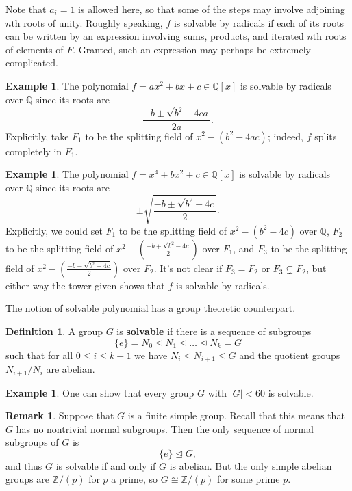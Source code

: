 \documentclass[12pt]{report}
\numberwithin{equation}{section}
\numberwithin{theorem}{chapter}
\theoremstyle{definition}
\newtheorem{definition}[theorem]{Definition}
\newtheorem{example}[theorem]{Example}
\newtheorem*{basic properties}{Basic Properties}
\newtheorem*{Important Remark}{Important Remark}
\newtheorem{remark}[theorem]{Remark}
\def\nsg{\unlhd}
\begin{document}
Note that $a_i = 1$ is allowed here, so that some of the steps may involve adjoining $n$th roots of unity. Roughly speaking, $f$ is solvable by radicals if each of its roots can be written by an expression involving sums, products, and iterated $n$th roots of elements of $F$. Granted, such an expression may perhaps be extremely complicated.

\begin{example}
	The polynomial $f = ax^2 + bx + c \in \mathbb{Q}[x]$ is solvable by radicals over $\mathbb{Q}$ since its roots are
	$$\frac{-b \pm \sqrt{b^2-4ca}}{2a}.$$
	Explicitly, take $F_1$ to be the splitting field of $x^2-(b^2-4ac)$; indeed, $f$ splits completely in $F_1$.
\end{example}


\begin{example} 
The polynomial $f = x^4 + bx^2 + c \in \mathbb{Q}[x]$ is solvable by radicals over $\mathbb{Q}$ since its roots are
$$\pm \sqrt{\frac{-b \pm \sqrt{b^2 - 4c}}{2}}.$$
Explicitly, we could set $F_1$ to be the splitting field of $x^2 - (b^2 - 4c)$ over $\mathbb{Q}$, $F_2$ to be the splitting field of $x^2 - \left(\frac{-b + \sqrt{b^2 - 4c}}{2}\right)$ over $F_1$, and $F_3$ to be the splitting field of $x^2 - \left(\frac{-b - \sqrt{b^2 - 4c}}{2}\right)$ over $F_2$. It's not clear if $F_3 = F_2$ or $F_3 \subsetneq F_2$, but either way the tower given shows that $f$ is solvable by radicals.	
\end{example}

The notion of solvable polynomial has a group theoretic counterpart.

\begin{definition}
A group $G$ is {\bf solvable} if there is a sequence of subgroups 
$$\{e\}=N_0 \nsg N_1 \nsg \ldots \nsg N_k = G$$ 
such that for all $0 \leqslant i \leqslant k-1$ we have $N_i \nsg N_{i+1} \leq G$ and the quotient groups $N_{i+1}/N_i$ are abelian.
\end{definition}


\begin{example}
	One can show that every group $G$ with $|G| < 60$ is solvable.
\end{example}

\begin{remark}\label{simple not solvable}
	Suppose that $G$ is a finite simple group. Recall that this means that $G$ has no nontrivial normal subgroups. Then the only sequence of normal subgroups of $G$ is
	$$\{ e \} \nsg G,$$
and thus $G$ is solvable if and only if $G$ is abelian. But the only simple abelian groups are $\mathbb{Z}/(p)$ for $p$ a prime, so $G \cong \mathbb{Z}/(p)$ for some prime $p$. 	
\end{remark}
\end{document}
